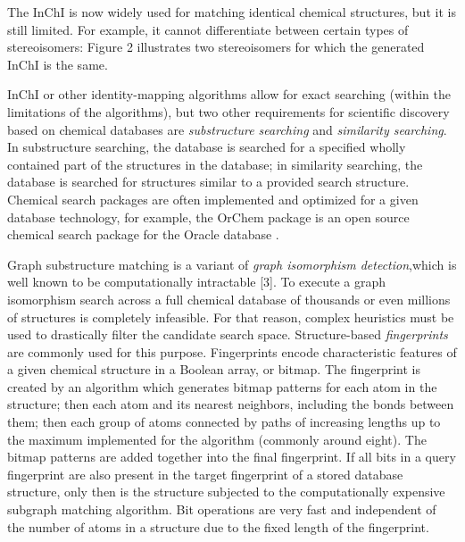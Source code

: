 \documentclass{sig-alternate}
\begin{document}

The InChI is now widely used for matching identical chemical structures, but it
is still limited. For example, it cannot differentiate between
certain types of stereoisomers: Figure 2 illustrates two stereoisomers for which
the generated InChI is the same.


InChI or other identity-mapping algorithms allow for exact searching (within the
limitations of the algorithms), but two other requirements for scientific
discovery based on chemical databases are \emph{substructure searching} and \emph{similarity
searching}. In substructure searching, the database is searched for a specified
wholly contained part of the structures in the database; in similarity
searching, the database is searched for structures similar to a provided search
structure. Chemical search packages are often implemented and optimized for a
given database technology, for example, the OrChem package is an open source
chemical search package for the Oracle database \cite{rijnbeek2009}.

Graph substructure matching is a variant of \emph{graph isomorphism detection},which is
well known to be computationally intractable [3]. To execute a graph isomorphism
search across a full chemical database of thousands or even millions of
structures is completely infeasible. For that reason, complex heuristics must be
used to drastically filter the candidate search space. Structure-based
\emph{fingerprints} are commonly used for this purpose. Fingerprints encode
characteristic features of a given chemical structure in a Boolean array, or
bitmap. The fingerprint is created by an algorithm which generates bitmap
patterns for each atom in the structure; then each atom and its nearest
neighbors, including the bonds between them; then each group of atoms connected
by paths of increasing lengths up to the maximum implemented for the algorithm
(commonly around eight). The bitmap patterns are added together into the final
fingerprint. If all bits in a query fingerprint are also present in the target
fingerprint of a stored database structure, only then is the structure subjected
to the computationally expensive subgraph matching algorithm. Bit operations are
very fast and independent of the number of atoms in a structure due to the fixed
length of the fingerprint.
\end{document}
